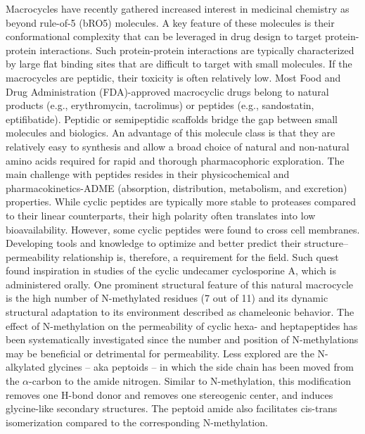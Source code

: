 Macrocycles have recently gathered increased interest in medicinal chemistry as beyond rule-of-5 (bRO5) molecules. \cite{Driggers2008, Mallinson2012, Doak2014, Dougherty2017, Marsault2011, Abdalla2018, Marsault2017, Caron2021}
A key feature of these molecules is their conformational complexity that can be leveraged in drug design to target protein-protein interactions. \cite{ Chene2006, Janin2008, Jones13, Scott2016, Modell2016}
Such protein-protein interactions are typically characterized by large flat binding sites that are difficult to target with small molecules. \cite{Doak2016}
If the macrocycles are peptidic, their toxicity is often relatively low. \cite{Zorzi2017}
Most Food and Drug Administration (FDA)-approved macrocyclic drugs belong to natural products (e.g., erythromycin, tacrolimus) or peptides (e.g., sandostatin, eptifibatide). \cite{Giordanetto2014}
Peptidic or semipeptidic scaffolds bridge the gap between small molecules and biologics. An advantage of this molecule class is that they are relatively easy to synthesis and allow a broad choice of natural and non-natural amino acids required for rapid and thorough pharmacophoric exploration. 
The main challenge with peptides resides in their physicochemical and pharmacokinetics-ADME (absorption, distribution, metabolism, and excretion) properties. 
While cyclic peptides are typically more stable to proteases compared to their linear counterparts, their high polarity often translates into low bioavailability.\cite{Naylor2017, Fosgerau2015}
However, some cyclic peptides were found to cross cell membranes.\cite{Naylor2017, Wang2014, Nielsen2014} 
Developing tools and knowledge to optimize and better predict their structure–permeability relationship is, therefore, a requirement for the field. Such quest found inspiration in studies of the cyclic undecamer cyclosporine A, which is administered orally. 
One prominent structural feature of this natural macrocycle is the high number of N-methylated residues (7 out of 11) and its dynamic structural adaptation to its environment described as chameleonic behavior. \cite{Whitty2016, Danelius2020, Witek2017}
The effect of N-methylation on the permeability of cyclic hexa- and heptapeptides has been systematically investigated since the number and position of N-methylations may be beneficial or detrimental for permeability. \cite{Nielsen2014, Raeder2018, White2011, Beck2012, Biron2008, White2011} 
%
Less explored are the N-alkylated glycines -- aka peptoids -- in which the side chain has been moved from the $\alpha$-carbon to the amide nitrogen. \cite{Schwochert2015} 
Similar to N-methylation, this modification removes one H-bond donor and removes one stereogenic center, and induces glycine-like secondary structures.
The peptoid amide also facilitates cis-trans isomerization compared to the corresponding N-methylation.\cite{Sui2007} 


